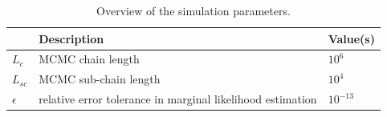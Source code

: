 \documentclass{article}
\begin{document}



\appendix

\begin{table}
  \centering 
  \begin{tabular}{p{} p{} p{}}
    \hline
                          & Description & Value(s) \\
    \hline
    \hline
    $L_c$                 & MCMC chain length & $10^6$ \\
    $L_{sc}$              & MCMC sub-chain length & $10^4$ \\
    $\epsilon$            & relative error tolerance in marginal likelihood estimation & $10^{-13}$ \\
    \hline
  \end{tabular}
  \caption{
    Overview of the simulation parameters. 
  }
  \label{table:parameters}
\end{table}
\end{document}
